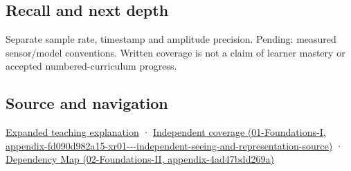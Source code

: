 \subsection{Recall and next depth}\label{appendix-1077ea8fc737-recall-and-next-depth}

Separate sample rate, timestamp and amplitude precision. Pending: measured sensor/model conventions. Written coverage is not a claim of learner mastery or accepted numbered-curriculum progress.

\subsection{Source and navigation}\label{appendix-1077ea8fc737-source-and-navigation}

\hyperref[04-visual-computing-ii-ch042-sampling-is-a-question-of-what-remains-distinguishable]{Expanded teaching explanation} · \href{../01-Foundations-I/main.pdf\#nameddest=appendix-fd090d982a15-xr01---independent-seeing-and-representation-source}{Independent coverage (01-Foundations-I, appendix-fd090d982a15-xr01-\/-\/-independent-seeing-and-representation-source)} · \href{../02-Foundations-II/main.pdf\#nameddest=appendix-4ad47bdd269a}{Dependency Map (02-Foundations-II, appendix-4ad47bdd269a)}
